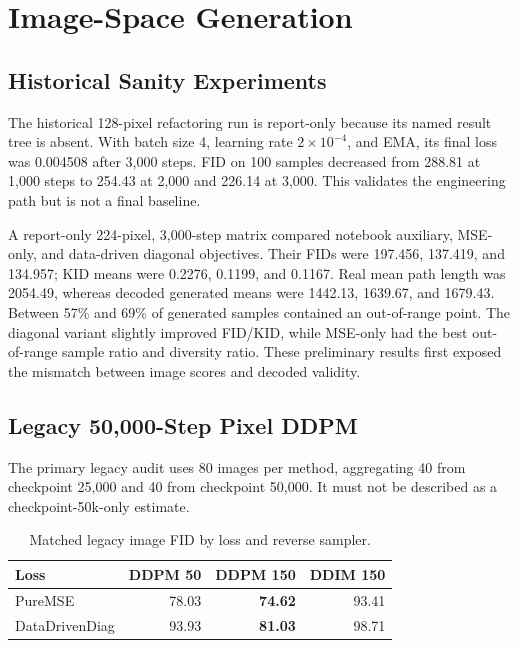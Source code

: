 \documentclass[12pt,a4paper,oneside]{report}
\begin{document}
\section{Image-Space Generation}

\subsection{Historical Sanity Experiments}

The historical 128-pixel refactoring run is report-only because its named result tree is absent. With batch size 4, learning rate $2\times10^{-4}$, and EMA, its final loss was 0.004508 after 3,000 steps. FID on 100 samples decreased from 288.81 at 1,000 steps to 254.43 at 2,000 and 226.14 at 3,000. This validates the engineering path but is not a final baseline.

A report-only 224-pixel, 3,000-step matrix compared notebook auxiliary, MSE-only, and data-driven diagonal objectives. Their FIDs were 197.456, 137.419, and 134.957; KID means were 0.2276, 0.1199, and 0.1167. Real mean path length was 2054.49, whereas decoded generated means were 1442.13, 1639.67, and 1679.43. Between 57\% and 69\% of generated samples contained an out-of-range point. The diagonal variant slightly improved FID/KID, while MSE-only had the best out-of-range sample ratio and diversity ratio. These preliminary results first exposed the mismatch between image scores and decoded validity.

\subsection{Legacy 50,000-Step Pixel DDPM}

The primary legacy audit uses 80 images per method, aggregating 40 from checkpoint 25,000 and 40 from checkpoint 50,000. It must not be described as a checkpoint-50k-only estimate.

\begin{table}[htbp]
\centering
\caption{Matched legacy image FID by loss and reverse sampler.}
\label{tab:legacy-fid}
\begin{tabular}{lrrr}
\toprule
Loss & DDPM 50 & DDPM 150 & DDIM 150 \\
\midrule
PureMSE & 78.03 & \textbf{74.62} & 93.41 \\
DataDrivenDiag & 93.93 & \textbf{81.03} & 98.71 \\
\bottomrule
\end{tabular}
\end{table}
\end{document}
